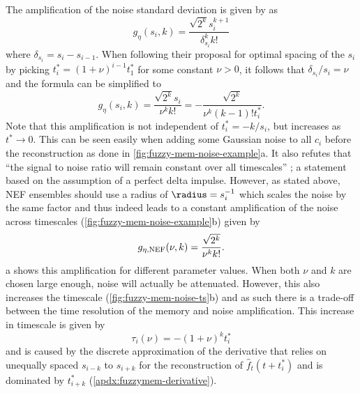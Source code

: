 The amplification of the noise standard deviation is given by \textcite{shankar2013} as
\begin{equation}
    g_{\eta}(s_i, k) = \frac{\sqrt{2^k} s_i^{k+1}}{\delta_{s_i}^k k!}
\end{equation}
where $\delta_{s_i} = s_i - s_{i - 1}$. 
When following their proposal for optimal spacing of the $s_i$ by picking $t_i^* = (1 + \nu)^{i - 1} t_1^*$ for some constant $\nu > 0$, it follows that $\delta_{s_i} / s_i = \nu$ and the formula can be simplified to  %
\begin{equation}
    g_{\eta}(s_i, k) = \frac{\sqrt{2^k} s_i}{\nu^k k!} = - \frac{\sqrt{2^k}}{\nu^k (k-1)! t_i^*} \text{.}
\end{equation}
Note that this amplification is not independent of $t_i^* = -k/s_i$, but increases as $t^* \rightarrow 0$.
This can be seen easily when adding some Gaussian noise to all $c_i$ before the reconstruction as done in \cref{fig:fuzzy-mem-noise-example}a.
It also refutes that ``the signal to noise ratio will remain constant over all timescales'' \parencite{shankar2013}; a statement based on the assumption of a perfect delta impulse.
However, as stated above, NEF ensembles should use a radius of $\radius = s_i^{-1}$ which scales the noise by the same factor and thus indeed leads to a constant amplification of the noise across timescales (\cref{fig:fuzzy-mem-noise-example}b) given by
\begin{equation}
    g_{\eta,{\mathrm{NEF}}}(\nu, k) = \frac{\sqrt{2^k}}{\nu^k k!} \text{.}
\end{equation}
a shows this amplification for different parameter values.
When both $\nu$ and $k$ are chosen large enough, noise will actually be attenuated.
However, this also increases the timescale (\cref{fig:fuzzy-mem-noise-ts}b) and as such there is a trade-off between the time resolution of the memory and noise amplification.
This increase in timescale is given by
\begin{equation}
    \tau_i(\nu) = - {(1 + \nu)}^k t^*_i \label{eqn:fuzzymem-ts}
\end{equation}
and is caused by the discrete approximation of the derivative that relies on unequally spaced $s_{i - k}$ to $s_{i + k}$ for the reconstruction of $\hat{f}_t(t + t^*_i)$ and is dominated by $t^*_{i + k}$ (\cref{apdx:fuzzymem-derivative}).
